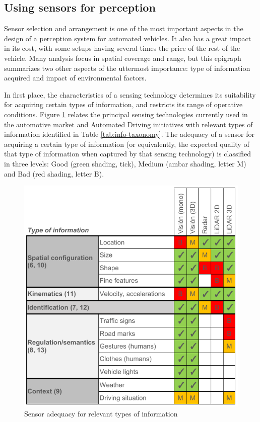 \subsection{Using sensors for perception}
\label{sec:03-e-sensors-for-perception}

Sensor selection and arrangement is one of the most important aspects in the 
design of a perception system for automated vehicles. It also has a great impact
in its cost, with some setups having several times the price of the rest of 
the vehicle. 
Many analysis focus in spatial coverage and range, but this epigraph summarizes
two other aspects of the uttermost importance: type of information acquired and 
impact of environmental factors.

In first place, the characteristics of a sensing technology determines its 
suitability for acquiring certain types of information, and restricts its range 
of operative conditions.
Figure \ref{fig:information_vs_sensors} relates the principal sensing 
technologies currently used in the automotive market and Automated Driving
initiatives with relevant types of information identified in Table 
\ref{tab:info-taxonomy}. The adequacy of a sensor for acquiring a certain type
of information (or equivalently, the expected quality of that type of
information when captured by that sensing technology) is classified in three
levels: Good (green shading, tick), Medium (ambar shading, letter M) and Bad
(red shading, letter B).

\begin{figure}[h]
    \centering
    \includegraphics[width=0.95\linewidth]{"img/information_types_sensors"}
    \caption{Sensor adequacy for relevant types of information}
    \label{fig:information_vs_sensors}
\end{figure}

